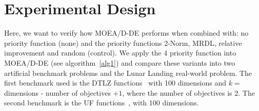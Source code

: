 \section{Experimental Design}

%


Here, we want to verify how MOEA/D-DE performs when combined with: no priority function (none) and the priority functions 2-Norm, MRDL, relative improvement and random (control). We apply the 4 priority function into MOEA/D-DE (see algorithm~\ref{alg1}) and compare these variants into two artificial benchmark problems and the Lunar Landing real-world problem. The first benchmark used is the DTLZ functions~\cite{deb2005scalable} with 100 dimensions and $k =$ dimensions - number of objectives $+ 1$, where the number of objectives is $2$. The second benchmark is the UF functions~\cite{zhang2008multiobjective}, with 100 dimensions. 




